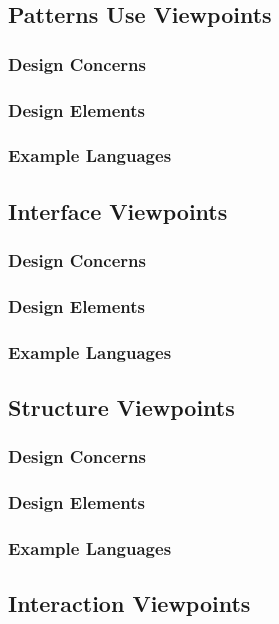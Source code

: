 \documentclass[letterpaper,10pt,titlepage,draftclsnofoot,onecolumn,onesided] {IEEEtran}
\begin{document}
\subsection{Patterns Use Viewpoints}
\subsubsection{Design Concerns}
\subsubsection{Design Elements}
\subsubsection{Example Languages}

\subsection{Interface Viewpoints}
\subsubsection{Design Concerns}
\subsubsection{Design Elements}
\subsubsection{Example Languages}

\subsection{Structure Viewpoints}
\subsubsection{Design Concerns}
\subsubsection{Design Elements}
\subsubsection{Example Languages}

\subsection{Interaction Viewpoints}
\end{document}
